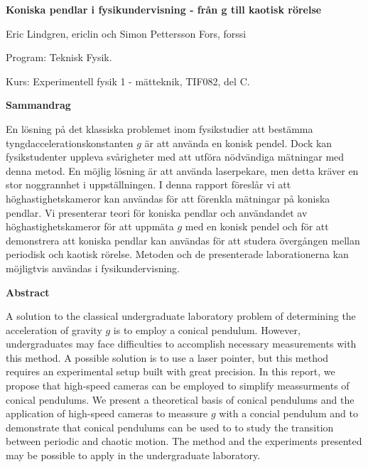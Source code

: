 \documentclass[12pt,a4paper]{article}
\begin{document}

\begin{center}
{\huge\bf Koniska pendlar i fysikundervisning - från g till kaotisk rörelse}
\end{center}
\vspace{1.0cm}

\begin{center}
Eric Lindgren, ericlin och Simon Pettersson Fors, forssi

Program: Teknisk Fysik. 

Kurs: Experimentell fysik 1 - mätteknik, TIF082, del C.
\end{center}
\vspace{1.0cm}

\centerline{\bf Sammandrag}
\vspace{5mm}
\noindent En lösning på det klassiska problemet inom fysikstudier att bestämma tyngdaccelerationskonstanten $g$ är att använda en konisk pendel. Dock kan fysikstudenter uppleva svårigheter med att utföra nödvändiga mätningar med denna metod. En möjlig lösning är att använda laserpekare, men detta kräver en stor noggrannhet i uppställningen. I denna rapport föreslår vi att höghastighetskameror kan användas för att förenkla mätningar på koniska pendlar. Vi presenterar teori för koniska pendlar och användandet av höghastighetskameror för att uppmäta $g$ med en konisk pendel och för att demonstrera att koniska pendlar kan användas för att studera övergången mellan periodisk och kaotisk rörelse. Metoden och de presenterade laborationerna kan möjligtvis användas i fysikundervisning.

\vspace{5mm}
\centerline{\bf Abstract}
\vspace{5mm}
\noindent A solution to the classical undergraduate laboratory problem of determining the acceleration of gravity $g$ is to employ a conical pendulum. However, undergraduates may face difficulties to accomplish necessary measurements with this method.  A possible solution is to use a laser pointer, but this method requires an experimental setup built with great precision. In this report, we propose that high-speed cameras can be employed to simplify meassurments of conical pendulums. We present a theoretical basis of conical pendulums and the application of high-speed cameras to meassure $g$ with a concial pendulum and to demonstrate that conical pendulums can be used to to study the transition between periodic and chaotic motion. The method and the experiments presented may be possible to apply in the undergraduate laboratory.
\end{document}
